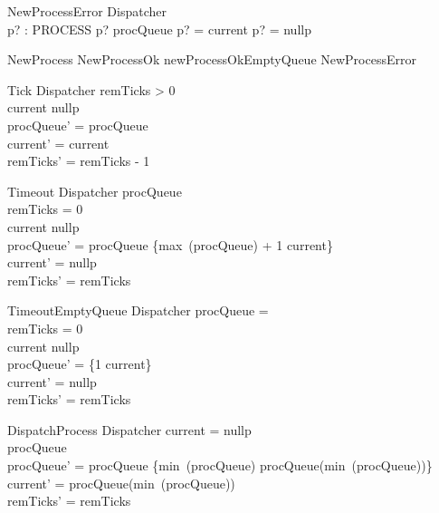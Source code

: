 \begin{schema}{NewProcessError}
    \Xi Dispatcher \\
    p? : PROCESS
\where
    p? \in \ran procQueue \lor p? = current \lor p? = nullp
\end{schema}

\begin{zed}
    NewProcess  NewProcessOk \lor newProcessOkEmptyQueue \lor NewProcessError
\end{zed}

\begin{schema}{Tick}
    \Delta Dispatcher
\where
    remTicks > 0 \\
    current \neq nullp \\
    procQueue' = procQueue \\
    current' = current \\
    remTicks' = remTicks - 1    
\end{schema}

\begin{schema}{Timeout}
    \Delta Dispatcher
\where
    procQueue \neq \emptyset \\
    remTicks = 0 \\
    current \neq nullp \\
    procQueue' = procQueue \cup \{max~(\dom procQueue) + 1 \mapsto current\} \\
    current' = nullp \\
    remTicks' = remTicks 
\end{schema}

\begin{schema}{TimeoutEmptyQueue}
    \Delta Dispatcher
\where
    procQueue = \emptyset \\
    remTicks = 0 \\
    current \neq nullp \\
    procQueue' = \{1 \mapsto current\} \\
    current' = nullp \\
    remTicks' = remTicks 
\end{schema}

\begin{schema}{DispatchProcess}
    \Delta Dispatcher
\where
    current = nullp \\
    procQueue \neq \emptyset \\
    procQueue' = procQueue \setminus \{min~(\dom procQueue) \mapsto procQueue(min~(\dom procQueue))\} \\
    current' = procQueue(min~(\dom procQueue)) \\
    remTicks' = remTicks 
\end{schema}

